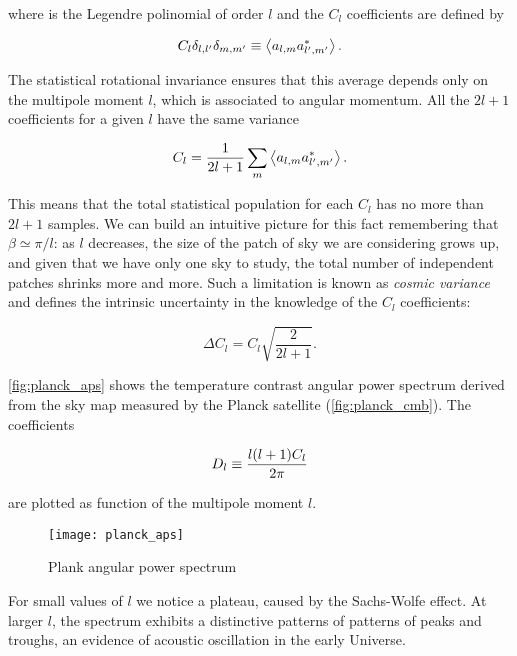 where is the Legendre polinomial of order $l$ and the $C_l$ coefficients
are defined by

\begin{equation}
        C_l \delta_{l,l'} \delta_{m,m'} \equiv \expval{a_{l,m} a^*_{l',m'}}.
\end{equation}

The statistical rotational
invariance ensures that this average depends only on the multipole moment
$l$, which is associated to angular momentum. All the $2l + 1$ coefficients
for a given $l$ have the same variance

\begin{equation}
        C_l = \frac{1}{2l + 1} \sum_m \expval{a_{l,m} a^*_{l',m'}}.
\end{equation}

This means that the total statistical population for each $C_l$ has no more
than $2l + 1$ samples. We can build an intuitive picture for this fact
remembering that $\beta \simeq \pi/l$: as $l$ decreases, the size of
the patch of sky we are considering grows up, and given that we have only
one sky to study, the total number of independent patches shrinks more and
more. Such a limitation is known as \emph{cosmic variance} and defines the
intrinsic uncertainty in the knowledge of the $C_l$ coefficients:

\begin{equation}
        \Delta C_l = C_l \sqrt{\frac{2}{2l + 1}}.
\end{equation}

\autoref{fig:planck_aps} shows the temperature contrast angular power
spectrum derived from the sky map measured by the
Planck satellite (\autoref{fig:planck_cmb}). The coefficients

\begin{equation}
        D_l \equiv \frac{l\qty(l + 1)C_l}{2\pi}
\end{equation}

are plotted as function of the multipole moment $l$.

\begin{figure}
        \centering
        \texttt{[image: planck\_aps]}
        \caption{Plank angular power spectrum}
        \label{fig:planck_aps}
\end{figure}

For small values of $l$ we notice a plateau, caused by the Sachs-Wolfe
effect. At larger $l$, the spectrum exhibits a distinctive patterns of
patterns of peaks and troughs, an evidence of acoustic oscillation in the
early Universe.

